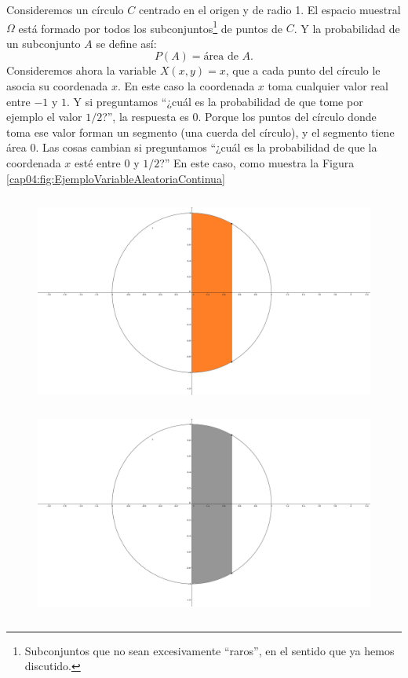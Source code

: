 \begin{Ejemplo}\label{ejem:ProbabilidadGeometricaSubconjuntosCirculo}
    Consideremos un círculo $C$ centrado en el origen y de radio 1. El espacio muestral $\Omega$ está formado por todos los subconjuntos\footnote{Subconjuntos que no sean excesivamente ``raros'', en el sentido que ya hemos discutido.} de puntos de $C$. Y la probabilidad de un subconjunto $A$ se define así:
    \[P(A)=\mbox{área de }A.\]
    Consideremos ahora la variable $X(x,y)=x$, que a cada punto del círculo le asocia su coordenada $x$. En este caso la coordenada $x$ toma cualquier valor real entre $-1$ y $1$. Y si preguntamos {``¿cuál es la probabilidad de que tome por ejemplo el valor $1/2$?''}, la respuesta es $0$. Porque los puntos del círculo donde toma ese valor forman un segmento (una cuerda del círculo), y el segmento tiene área $0$. Las cosas cambian si preguntamos {``¿cuál es la probabilidad de que la coordenada $x$ esté entre $0$ y $1/2$?''} En este caso, como muestra la Figura \ref{cap04:fig:EjemploVariableAleatoriaContinua}
    \begin{figure}[h]
	\centering
	\begin{enColor}
    \includegraphics[height=7cm]{../fig/Cap04-Figura01-VariableAleatoriaContinua.png}
	\end{enColor}
	\begin{bn}
    \includegraphics[height=7cm]{../fig/Cap04-Figura01-VariableAleatoriaContinua-bn.png}

\end{bn}
\end{figure}
\end{Ejemplo}
